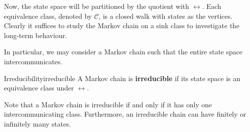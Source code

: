 \documentclass[math, code]{amznotes}
\theoremstyle{remark}
\begin{document}
Now, the state space will be partitioned by the quotient with $\leftrightarrow$. Each equivalence class, denoted by $\mathcal{C}$, is a closed walk with states as the vertices. Clearly it suffices to study the Markov chain on a sink class to investigate the long-term behaviour.

In particular, we may consider a Markov chain such that the entire state space intercommunicates.
\begin{dfnbox}{Irreducibility}{irreducible}
    A Markov chain is {\color{red} \textbf{irreducible}} if its state space is an equivalence class under $\leftrightarrow$.
\end{dfnbox}
Note that a Markov chain is irreducible if and only if it has only one intercommunicating class. Furthermore, an irreducible chain can have finitely or infinitely many states.
\end{document}
